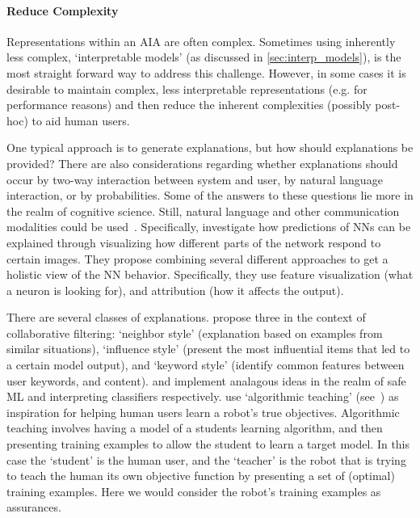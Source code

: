 \paragraph{Reduce Complexity} \label{sec:reduce_complexity}
Representations within an AIA are often complex. Sometimes using inherently less complex, `interpretable models' (as discussed in \ref{sec:interp_models}), is the most straight forward way to address this challenge. However, in some cases it is desirable to maintain complex, less interpretable representations (e.g. for performance reasons) and then reduce the inherent complexities (possibly post-hoc) to aid human users.

One typical approach is to generate explanations, but how should explanations be provided? There are also considerations regarding whether explanations should occur by two-way interaction between system and user, by natural language interaction, or by probabilities. Some of the answers to these questions lie more in the realm of cognitive science. Still, natural language and other communication modalities could be used~\cite{Hayes2017-nt}. Specifically, \citet{Olah2018-rp} investigate how predictions of NNs can be explained through visualizing how different parts of the network respond to certain images. They propose combining several different approaches to get a holistic view of the NN behavior. Specifically, they use feature visualization (what a neuron is looking for), and attribution (how it affects the output).

There are several classes of explanations. \citet{Abdollahi2018-uw} propose three in the context of collaborative filtering: `neighbor style' (explanation based on examples from similar situations), `influence style' (present the most influential items that led to a certain model output), and `keyword style' (identify common features between user keywords, and content). \citet{Otte2013-oo} and \citet{Ribeiro2016-uc} implement analagous ideas in the realm of safe ML and interpreting classifiers respectively. 
\citet{Huang2017-lk} use `algorithmic teaching' (see~\cite{Balbach2009-jw}) as inspiration for helping human users learn a robot's true objectives. Algorithmic teaching involves having a model of a students learning algorithm, and then presenting training examples to allow the student to learn a target model. In this case the `student' is the human user, and the `teacher' is the robot that is trying to teach the human its own objective function by presenting a set of (optimal) training examples. Here we would consider the robot's training examples as assurances.

